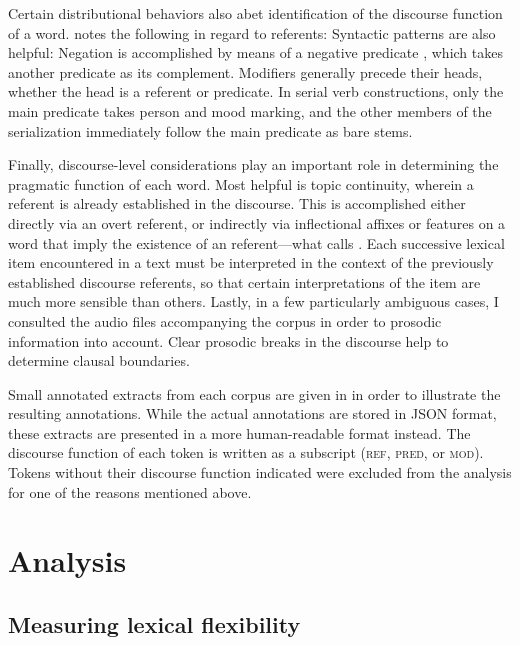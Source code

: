 Certain distributional behaviors also abet identification of the discourse function of a word. \citeauthor{Nakayama2001} notes the following in regard to referents:  Syntactic patterns are also helpful: Negation is accomplished by means of a negative predicate , which takes another predicate as its complement. Modifiers generally precede their heads, whether the head is a referent or predicate. In serial verb constructions, only the main predicate takes person and mood marking, and the other members of the serialization immediately follow the main predicate as bare stems.

Finally, discourse-level considerations play an important role in determining the pragmatic function of each word. Most helpful is topic continuity, wherein a referent is already established in the discourse. This is accomplished either directly via an overt referent, or indirectly via inflectional affixes or features on a word that imply the existence of an referent—what \textcite{Kibrik2011} calls . Each successive lexical item encountered in a text must be interpreted in the context of the previously established discourse referents, so that certain interpretations of the item are much more sensible than others. Lastly, in a few particularly ambiguous cases, I consulted the audio files accompanying the corpus in order to prosodic information into account. Clear prosodic breaks in the discourse help to determine clausal boundaries.

Small annotated extracts from each corpus are given in  in order to illustrate the resulting annotations. While the actual annotations are stored in JSON format, these extracts are presented in a more human-readable format instead. The discourse function of each token is written as a subscript (\textsc{ref}, \textsc{pred}, or \textsc{mod}). Tokens without their discourse function indicated were excluded from the analysis for one of the reasons mentioned above.

\section{Analysis}
\label{sec:3.4}

\subsection{Measuring lexical flexibility}
\label{sec:3.4.1}

